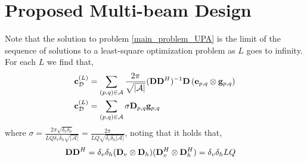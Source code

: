 \section{Proposed Multi-beam Design}
\label{sec:proposed}

Note that the solution to problem \ref{main_problem_UPA} is the limit of the sequence of solutions to a least-square optimization problem as $L$ goes to infinity. For each $L$ we find that,
 \begin{align}
& {{\bf{c}}}^{(L)}_{\mathcal{D}} = \sum_{(p,q) \in \mathcal{A}}\frac{2\pi}{\sqrt{|\mathcal{A}|}}({\bf{D}} {\bf{D}}^H)^{-1} {\bf{D}}  \left(\mathbf{e}_{p,q} \otimes \mathbf{g}_{p,q}\right) \\
& {{\bf{c}}}^{(L)}_{\mathcal{D}} = \sum_{(p,q) \in \mathcal{A}}\sigma {\bf{D}}_{p,q}{\bf{g}}_{p,q} \label{c_final_eq}
\end{align}
where $\sigma = \frac{{ 2\pi \sqrt{\delta_{v}\delta_{h}} }}{L Q\delta_{v}\delta_{h}\sqrt{|\mathcal{A}|}} = \frac{2\pi}{LQ\sqrt{\delta_{v}\delta_{h}|\mathcal{A}|}}$, noting that it holds that, 
\begin{align}
{\bf{D}}{\bf{D}}^H &= \delta_v\delta_h({\bf{D}}_v \otimes{\bf{D}}_h)({\bf{D}}_v^H \otimes {\bf{D}}_h^H) = \delta_v\delta_hLQ
\end{align}




